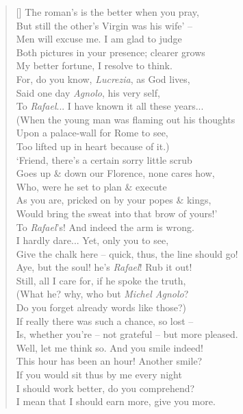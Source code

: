 \documentclass[MAIN]{subfiles}
\begin{document}
\begin{verse}[\versewidth]
The roman's is the better when you pray,\\
But still the other's Virgin was his wife' --\\
Men will excuse me. I am glad to judge\\
Both pictures in your presence; clearer grows\\
My better fortune, I resolve to think.\\
For, do you know, \emph{Lucrezia}, as God lives,\\ 
Said one day \emph{Agnolo}, his very self,\\
To \emph{Rafael}... I have known it all these years...\\
(When the young man was flaming out his thoughts\\
Upon a palace-wall for {\sc Rome} to see,\\
Too lifted up in heart because of it.)\\
`Friend, there's a certain sorry little scrub\\
Goes up \& down our {\sc Florence}, none cares how,\\
Who, were he set to plan \& execute\\
As you are, pricked on by your popes \& kings,\\
Would bring the sweat into that brow of yours!'\\
To \emph{Rafael}'s! And indeed the arm is wrong.\\
I hardly dare... Yet, only you to see,\\ 
Give the chalk here -- quick, thus, the line should go!\\
Aye, but the soul! he's \emph{Rafael}! Rub it out!\\
Still, all I care for, if he spoke the truth,\\
(What he? why, who but \emph{Michel Agnolo}?\\
Do you forget already words like those?)\\
If really there was such a chance, so lost --\\
Is, whether you're -- not grateful -- but more pleased.\\
Well, let me think so. And you smile indeed!\\
This hour has been an hour! Another smile?\\
If you would sit thus by me every night\\
I should work better, do you comprehend?\\
I mean that I should earn more, give you more.\\

\end{verse}
\end{document}
